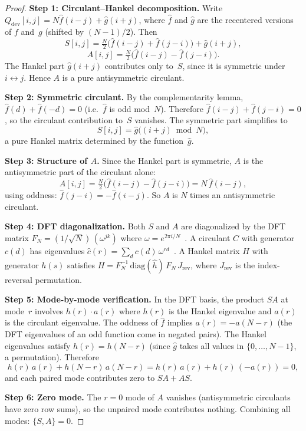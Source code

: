 \documentclass[aip,jmp,reprint,superscriptaddress,floatfix,nofootinbib]{revtex4-2}
\theoremstyle{definition}
\theoremstyle{remark}
\begin{document}
\begin{proof}
\noindent
\textbf{Step 1: Circulant--Hankel decomposition.}
Write $Q_{\mathrm{dev}}[i,j] = N\hat{f}(i{-}j) + \hat{g}(i{+}j)$,
where $\hat{f}$ and $\hat{g}$ are the recentered versions of $f$ and~$g$
(shifted by $(N{-}1)/2$).  Then
\[
  S[i,j] = \tfrac{N}{2}\bigl(\hat{f}(i{-}j) + \hat{f}(j{-}i)\bigr)
            + \hat{g}(i{+}j),
\]
\[
  A[i,j] = \tfrac{N}{2}\bigl(\hat{f}(i{-}j) - \hat{f}(j{-}i)\bigr).
\]
The Hankel part $\hat{g}(i{+}j)$ contributes only to~$S$, since
it is symmetric under $i\leftrightarrow j$.  Hence $A$ is a pure
antisymmetric circulant.

\medskip\noindent
\textbf{Step 2: Symmetric circulant.}
By the complementarity lemma, $\hat{f}(d) + \hat{f}(-d) = 0$
(i.e.\ $\hat{f}$ is odd mod~$N$).  Therefore $\hat{f}(i{-}j) +
\hat{f}(j{-}i) = 0$, so the circulant contribution to~$S$ vanishes.
The symmetric part simplifies to
\begin{equation}\label{eq:s-hankel}
  S[i,j] = \hat{g}\!\bigl((i+j)\bmod N\bigr),
\end{equation}
a pure Hankel matrix determined by the function~$\hat{g}$.

\medskip\noindent
\textbf{Step 3: Structure of $A$.}
Since the Hankel part is symmetric, $A$ is the antisymmetric part
of the circulant alone:
\begin{equation}\label{eq:a-circulant}
  A[i,j] = \tfrac{N}{2}\bigl(\hat{f}(i{-}j) - \hat{f}(j{-}i)\bigr)
          = N\,\hat{f}(i{-}j),
\end{equation}
using oddness: $\hat{f}(j{-}i) = -\hat{f}(i{-}j)$.
So $A$ is $N$ times an antisymmetric circulant.

\medskip\noindent
\textbf{Step 4: DFT diagonalization.}
Both $S$ and $A$ are diagonalized by the DFT matrix
$F_N = (1/\sqrt{N})\,(\omega^{jk})$ where
$\omega = e^{2\pi i/N}$~\cite{terras}.
A circulant $C$ with generator $c(d)$ has eigenvalues
$\hat{c}(r) = \sum_d c(d)\,\omega^{rd}$~\cite{davis,gray}.
A Hankel matrix $H$ with generator $h(s)$ satisfies
$H = F_N^{-1}\,\mathrm{diag}(\hat{h})\,F_N\,J_{\mathrm{rev}}$,
where $J_{\mathrm{rev}}$ is the index-reversal permutation.

\medskip\noindent
\textbf{Step 5: Mode-by-mode verification.}
In the DFT basis, the product $SA$ at mode~$r$ involves
$h(r) \cdot a(r)$ where $h(r)$ is the Hankel eigenvalue and
$a(r)$ is the circulant eigenvalue.  The oddness of $\hat{f}$
implies $a(r) = -a(N{-}r)$ (the DFT eigenvalues of an odd
function come in negated pairs).  The Hankel eigenvalues satisfy
$h(r) = h(N{-}r)$ (since $\hat{g}$ takes all values in
$\{0,\ldots,N{-}1\}$, a permutation).  Therefore
\begin{equation}
  h(r)\,a(r) + h(N{-}r)\,a(N{-}r)
  = h(r)\,a(r) + h(r)\,(-a(r)) = 0,
\end{equation}
and each paired mode contributes zero to $SA + AS$.

\medskip\noindent
\textbf{Step 6: Zero mode.}
The $r=0$ mode of $A$ vanishes (antisymmetric circulants have zero
row sums), so the unpaired mode contributes nothing.  Combining
all modes: $\{S,A\} = 0$.
\end{proof}
\end{document}
